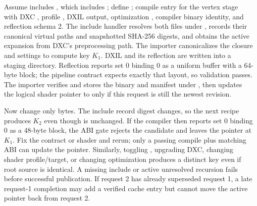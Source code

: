 \hypertarget{05-engine-i-ch010-solved-trace-one-variant-and-two-failures}{}

Assume  includes , which includes ; define ; compile entry  for the vertex stage with DXC , profile , DXIL output, optimization , compiler binary identity, and reflection schema 2. The include handler resolves both files under , records their canonical virtual paths and snapshotted SHA-256 digests, and obtains the active expansion from DXC's preprocessing path. The importer canonicalizes the closure and settings to compute key \(K_1\). DXIL and its reflection are written into a staging directory. Reflection reports set 0 binding 0 as a uniform buffer with a 64-byte block; the pipeline contract expects exactly that layout, so validation passes. The importer verifies and stores the binary and manifest under , then updates the logical shader pointer to  only if this request is still the newest revision.

Now change only  bytes. The include record digest changes, so the next recipe produces \(K_2\) even though  is unchanged. If the compiler then reports set 0 binding 0 as a 48-byte block, the ABI gate rejects the candidate and leaves the pointer at \(K_1\). Fix the contract or shader and rerun; only a passing compile plus matching ABI can update the pointer. Similarly, toggling , upgrading DXC, changing shader profile/target, or changing optimization produces a distinct key even if root source is identical. A missing include or active unresolved recursion fails before successful publication. If request 2 has already superseded request 1, a late request-1 completion may add a verified cache entry but cannot move the active pointer back from request 2.

